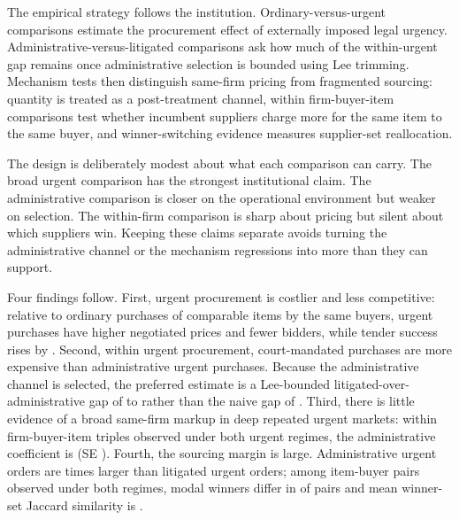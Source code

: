 The empirical strategy follows the institution.
Ordinary-versus-urgent comparisons estimate the procurement effect of
externally imposed legal urgency. Administrative-versus-litigated
comparisons ask how much of the within-urgent gap remains once
administrative selection is bounded using Lee trimming. Mechanism
tests then distinguish same-firm pricing from fragmented sourcing:
quantity is treated as a post-treatment channel, within
firm-buyer-item comparisons test whether incumbent suppliers charge
more for the same item to the same buyer, and winner-switching
evidence measures supplier-set reallocation.

The design is deliberately modest about what each comparison can
carry. The broad urgent comparison has the strongest institutional
claim. The administrative comparison is closer on the operational
environment but weaker on selection. The within-firm comparison is
sharp about pricing but silent about which suppliers win. Keeping
these claims separate avoids turning the administrative channel or the
mechanism regressions into more than they can support.

Four findings follow. First, urgent procurement is costlier and less
competitive: relative to ordinary purchases of comparable items by
the same buyers, urgent purchases have \BPnegPctHeadline{} higher
negotiated prices and \BPfirmsPctHeadlineAbs{} fewer bidders, while
tender success rises by \BPsuccessPP{}. Second, within urgent
procurement, court-mandated purchases are more expensive than
administrative urgent purchases. Because the administrative channel
is selected, the preferred estimate is a Lee-bounded
litigated-over-administrative gap of \BPutgBoundLow{} to
\BPutgBoundHigh{} rather than the naive gap of \BPutgPointNaive{}.
Third, there is little evidence of a broad same-firm markup in deep
repeated urgent markets: within firm-buyer-item triples observed
under both urgent regimes, the administrative coefficient is
\BPutgTripleCoefUTG{} (SE \BPutgTripleSEUTG{}). Fourth, the sourcing
margin is large. Administrative urgent orders are
\BPutgQtyAdminFoldPref{} times larger than litigated urgent orders;
among item-buyer pairs observed under both regimes, modal winners
differ in \BPwinnerSwitchDiffModalPct{} of pairs and mean winner-set
Jaccard similarity is \BPwinnerSwitchJaccardMean{}.

